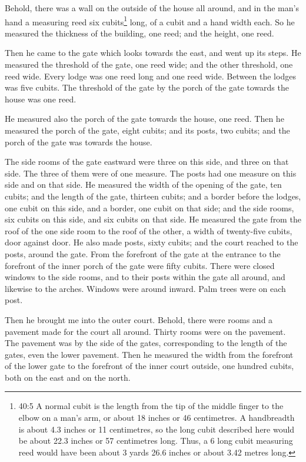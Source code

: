  Behold, there was a wall on the outside of the house all
around, and in the man's hand a measuring reed six cubits\footnote{40:5
  A normal cubit is the length from the tip of the middle finger to the
  elbow on a man's arm, or about 18 inches or 46 centimetres. A
  handbreadth is about 4.3 inches or 11 centimetres, so the long cubit
  described here would be about 22.3 inches or 57 centimetres long.
  Thus, a 6 long cubit measuring reed would have been about 3 yards 26.6
  inches or about 3.42 metres long.} long, of a cubit and a hand width
each. So he measured the thickness of the building, one reed; and the
height, one reed.

 Then he came to the gate which looks towards the east, and
went up its steps. He measured the threshold of the gate, one reed wide;
and the other threshold, one reed wide.  Every lodge was one
reed long and one reed wide. Between the lodges was five cubits. The
threshold of the gate by the porch of the gate towards the house was one
reed.

 He measured also the porch of the gate towards the house,
one reed.  Then he measured the porch of the gate, eight
cubits; and its posts, two cubits; and the porch of the gate was towards
the house.

 The side rooms of the gate eastward were three on this
side, and three on that side. The three of them were of one measure. The
posts had one measure on this side and on that side.  He
measured the width of the opening of the gate, ten cubits; and the
length of the gate, thirteen cubits;  and a border before
the lodges, one cubit on this side, and a border, one cubit on that
side; and the side rooms, six cubits on this side, and six cubits on
that side.  He measured the gate from the roof of the one
side room to the roof of the other, a width of twenty-five cubits, door
against door.  He also made posts, sixty cubits; and the
court reached to the posts, around the gate.  From the
forefront of the gate at the entrance to the forefront of the inner
porch of the gate were fifty cubits.  There were closed
windows to the side rooms, and to their posts within the gate all
around, and likewise to the arches. Windows were around inward. Palm
trees were on each post.

 Then he brought me into the outer court. Behold, there
were rooms and a pavement made for the court all around. Thirty rooms
were on the pavement.  The pavement was by the side of the
gates, corresponding to the length of the gates, even the lower
pavement.  Then he measured the width from the forefront of
the lower gate to the forefront of the inner court outside, one hundred
cubits, both on the east and on the north.

